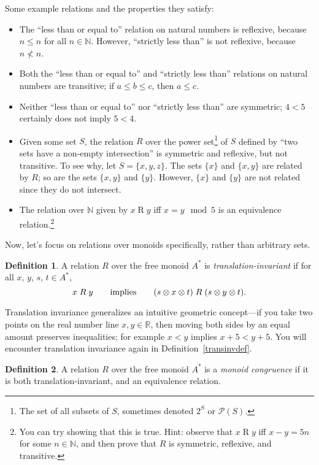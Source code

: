 \documentclass[a4paper,headsepline,bibliography=totoc,toc=flat,fleqn,twoside=semi]{scrbook}
\theoremstyle{definition}
\newtheorem{definition}{Definition}[chapter]
\theoremstyle{definition}
\theoremstyle{definition}
\begin{document}
Some example relations and the properties they satisfy:
\begin{itemize}
\item The ``less than or equal to'' relation on natural numbers is reflexive, because $n\le n$ for all $n\in\mathbb{N}$. However, ``strictly less than'' is not reflexive, because $n \nless n$.
\item Both the ``less than or equal to'' and ``strictly less than'' relations on natural numbers are transitive; if $a\le b\le c$, then $a\le c$.
\item Neither ``less than or equal to'' nor ``strictly less than'' are symmetric; $4 < 5$ certainly does not imply $5 < 4$.
\item Given some set $S$, the relation $R$ over the power set\footnote{The set of all subsets of $S$, sometimes denoted $2^S$ or $\mathcal{P}(S)$.} of $S$ defined by ``two sets have a non-empty intersection'' is symmetric and reflexive, but not transitive. To see why, let $S=\{x, y, z\}$. The sets $\{x\}$ and $\{x, y\}$ are related by $R$; so are the sets $\{x, y\}$ and $\{y\}$. However, $\{x\}$ and $\{y\}$ are not related since they do not intersect.
\item The relation over $\mathbb{N}$ given by $x\mathrel{R}y$ iff $x=y \mod 5$ is an equivalence relation.\footnote{You can try showing that this is true. Hint: observe that $x\mathrel{R}y$ iff $x-y=5n$ for some $n\in\mathbb{N}$, and then prove that $R$ is symmetric, reflexive, and transitive.}
\end{itemize}
Now, let's focus on relations over monoids specifically, rather than arbitrary sets.
\begin{definition}\label{transinv} A relation $R$ over the free monoid $A^*$ is \emph{translation-invariant} if for all $x$, $y$, $s$, $t\in A^*$,
\[x\mathrel{R}y\qquad\hbox{implies}\qquad (s\otimes x\otimes t)\mathrel{R}(s\otimes y\otimes t).\]
\end{definition}

Translation invariance generalizes an intuitive geometric concept---if you take two points on the real number line $x,y\in\mathbb{R}$, then moving both sides by an equal amount preserves inequalities; for example $x<y$ implies $x+5<y+5$. You will encounter translation invariance again in Definition~\ref{transinvdef}.

\begin{definition} A relation $R$ over the free monoid $A^*$ is a \emph{monoid congruence} if it is both translation-invariant, and an equivalence relation.
\end{definition}
\end{document}
